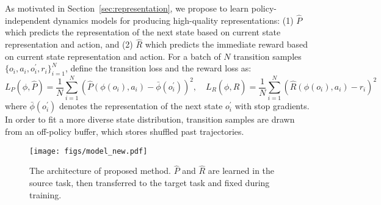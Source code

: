 As motivated in Section~\ref{sec:representation}, we propose to learn policy-independent dynamics models for producing high-quality representations: (1) $\hat{P}$ which predicts the representation of the next state based on current state representation and action, and (2) $\hat{R}$ which predicts the immediate reward based on current state representation and action. 
For a batch of $N$ transition samples $\{o_i, a_i, o^\prime_i, r_i\}_{i=1}^N$, define the transition loss and the reward loss as:
\setlength\abovedisplayskip{0pt}
\setlength\belowdisplayskip{2pt}
\begin{equation}
    L_P(\phi,\hat{P}) = \frac{1}{N} \sum_{i=1}^N ( \hat{P}(\phi(o_i), a_i) - \bar{\phi}(o^\prime_i) )^2, \quad
    L_R(\phi,\hat{R}) = \frac{1}{N} \sum_{i=1}^N ( \hat{R}(\phi(o_i), a_i) - r_i )^2 \label{eq:model_loss} 
\end{equation}
where $\bar{\phi}(o^\prime_i)$ denotes the representation of the next state $o^\prime_i$ with stop gradients. 
In order to fit a more diverse state distribution, transition samples are drawn from an off-policy buffer, which stores shuffled past trajectories.

\begin{wrapfigure}{r}{0.45\textwidth}
\vspace{-1em}
  \centering
  \texttt{[image: figs/model\_new.pdf]}
  \vspace{-1.5em}
  \caption{\small{The architecture of proposed method. $\hat{P}$ and $\hat{R}$ are learned in the source task, then transferred to the target task and fixed during training.}}
  \label{fig:model}
\vspace{-1em}
\end{wrapfigure}



